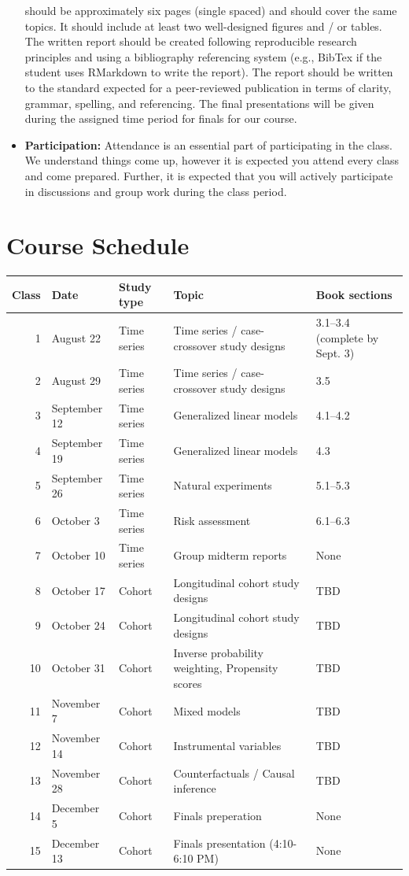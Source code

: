 \documentclass[
]{book}
\begin{document}
\begin{itemize}
  should be approximately six pages (single spaced) and should cover the
  same topics. It should include at least two well-designed figures and / or
  tables. The written report should be created following reproducible
  research principles and using a bibliography referencing system (e.g.,
  BibTex if the student uses RMarkdown to write the report). The report
  should be written to the standard expected for a peer-reviewed
  publication in terms of clarity, grammar, spelling, and referencing.
  The final presentations will be given during the assigned time period
  for finals for our course.
\item
  \textbf{Participation:} Attendance is an essential part of participating
  in the class. We understand things come up, however it is expected you
  attend every class and come prepared. Further, it is expected that you will
  actively participate in discussions and group work during the class period.
\end{itemize}

\hypertarget{course-schedule}{%
\section{Course Schedule}\label{course-schedule}}

\begin{tabular}{r|l|l|l|l}
\hline
Class & Date & Study type & Topic & Book sections\\
\hline
1 & August 22 & Time series & Time series / case-crossover study designs & 3.1--3.4 (complete by Sept. 3)\\
\hline
2 & August 29 & Time series & Time series / case-crossover study designs & 3.5\\
\hline
3 & September 12 & Time series & Generalized linear models & 4.1--4.2\\
\hline
4 & September 19 & Time series & Generalized linear models & 4.3\\
\hline
5 & September 26 & Time series & Natural experiments & 5.1--5.3\\
\hline
6 & October 3 & Time series & Risk assessment & 6.1--6.3\\
\hline
7 & October 10 & Time series & Group midterm reports & None\\
\hline
8 & October 17 & Cohort & Longitudinal cohort study designs & TBD\\
\hline
9 & October 24 & Cohort & Longitudinal cohort study designs & TBD\\
\hline
10 & October 31 & Cohort & Inverse probability weighting, Propensity scores & TBD\\
\hline
11 & November 7 & Cohort & Mixed models & TBD\\
\hline
12 & November 14 & Cohort & Instrumental variables & TBD\\
\hline
13 & November 28 & Cohort & Counterfactuals / Causal inference & TBD\\
\hline
14 & December 5 & Cohort & Finals preperation & None\\
\hline
15 & December 13 & Cohort & Finals presentation (4:10-6:10 PM) & None\\
\hline
\end{tabular}
\end{document}
